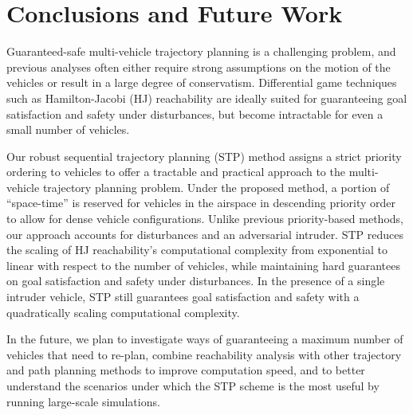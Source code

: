 \section{Conclusions and Future Work}
Guaranteed-safe multi-vehicle trajectory planning is a challenging problem, and previous analyses often either require strong assumptions on the motion of the vehicles or result in a large degree of conservatism. Differential game techniques such as Hamilton-Jacobi (HJ) reachability are ideally suited for guaranteeing goal satisfaction and safety under disturbances, but become intractable for even a small number of vehicles.

Our robust sequential trajectory planning (STP) method assigns a strict priority ordering to vehicles to offer a tractable and practical approach to the multi-vehicle trajectory planning problem. Under the proposed method, a portion of ``space-time'' is reserved for vehicles in the airspace in descending priority order to allow for dense vehicle configurations. Unlike previous priority-based methods, our approach accounts for disturbances and an adversarial intruder. STP reduces the scaling of HJ reachability's computational complexity from exponential to linear with respect to the number of vehicles, while maintaining hard guarantees on goal satisfaction and safety under disturbances. In the presence of a single intruder vehicle, STP still guarantees goal satisfaction and safety with a quadratically scaling computational complexity.

In the future, we plan to investigate ways of guaranteeing a maximum number of vehicles that need to re-plan, combine reachability analysis with other trajectory and path planning methods to improve computation speed, and to better understand the scenarios under which the STP scheme is the most useful by running large-scale simulations.
\vspace{-0.2cm}
